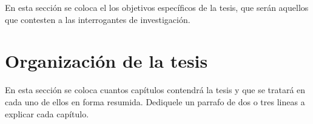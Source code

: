 En esta sección se coloca el los objetivos específicos de la tesis, que serán aquellos que contesten a las
interrogantes de investigación.

\section{Organización de la tesis}

En esta sección se coloca cuantos capítulos contendrá la tesis y que se tratará en cada uno de
ellos en forma resumida. Dediquele un parrafo de dos o tres lineas a explicar cada capítulo.

